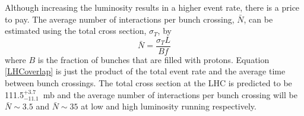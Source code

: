 Although increasing the luminosity results in a higher event rate, there is a price to pay. The average number of interactions per bunch crossing, $\bar{N}$, can be estimated using the total cross section, $\sigma_{T}$, by
\begin{equation}\label{LHCoverlap}
\bar{N} = \frac{\sigma_{T} L}{B f}
\end{equation}
where $B$ is the fraction of bunches that are filled with protons.
Equation \ref{LHCoverlap} is just the product of the total event rate and the average time between bunch crossings. The total cross section at the LHC is predicted to be 111.5$^{+3.7}_{-11.1}$~mb \cite{Cudell:2002sy} and the average number of interactions per bunch crossing 
will be $\bar{N}\sim3.5$ and $\bar{N}\sim35$ at low and high luminosity running respectively. 